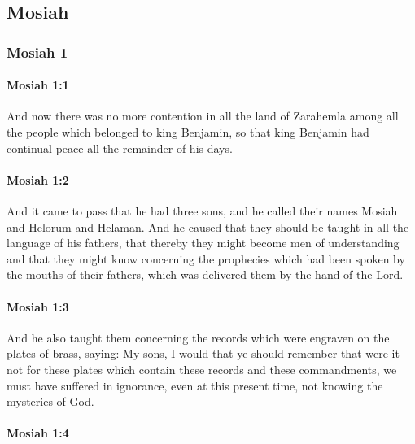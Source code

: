 \subsection{Mosiah}
	\label{MOSIAH}

	\subsubsection{Mosiah 1} %
		\label{MOSIAH-1}
	
		\paragraph{Mosiah 1:1} %
			\label{MOSIAH-1-1}

			And now there was no more contention in all the land of Zarahemla
			among all the people which belonged to king Benjamin,
			so that king Benjamin had continual peace all the remainder of his days.

		\paragraph{Mosiah 1:2} %
			\label{MOSIAH-1-2}

			And it came to pass that he had three sons,
			and he called their names Mosiah and Helorum and Helaman.
			And he caused that they should be taught in all the language of his fathers,
			that thereby they might become men of understanding
			and that they might know concerning the prophecies
			which had been spoken by the mouths of their fathers,
			which was delivered them by the hand of the Lord.

		\paragraph{Mosiah 1:3} %
			\label{MOSIAH-1-3}

			And he also taught them concerning the records
			which were engraven on the plates of brass, saying:
			My sons, I would that ye should remember
			that were it not for these plates
			which contain these records and these commandments,
			we must have suffered in ignorance, even at this present time,
			not knowing the mysteries of God.

		\paragraph{Mosiah 1:4} %
			\label{MOSIAH-1-4}

